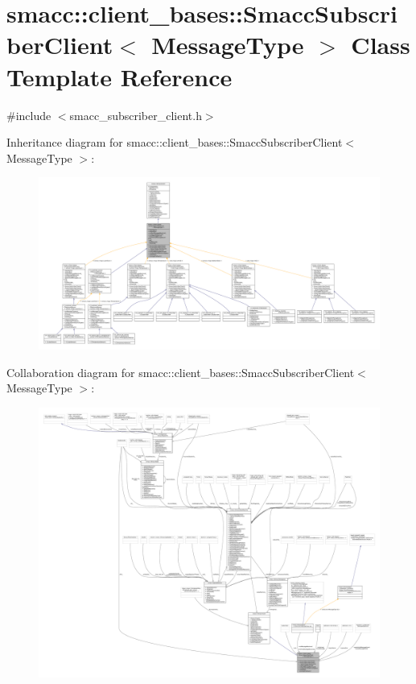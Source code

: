 \hypertarget{classsmacc_1_1client__bases_1_1SmaccSubscriberClient}{}\section{smacc\+:\+:client\+\_\+bases\+:\+:Smacc\+Subscriber\+Client$<$ Message\+Type $>$ Class Template Reference}
\label{classsmacc_1_1client__bases_1_1SmaccSubscriberClient}


{\ttfamily \#include $<$smacc\+\_\+subscriber\+\_\+client.\+h$>$}



Inheritance diagram for smacc\+:\+:client\+\_\+bases\+:\+:Smacc\+Subscriber\+Client$<$ Message\+Type $>$\+:
\nopagebreak
\begin{figure}[H]
\begin{center}
\leavevmode
\includegraphics[width=350pt]{classsmacc_1_1client__bases_1_1SmaccSubscriberClient__inherit__graph}
\end{center}
\end{figure}


Collaboration diagram for smacc\+:\+:client\+\_\+bases\+:\+:Smacc\+Subscriber\+Client$<$ Message\+Type $>$\+:
\nopagebreak
\begin{figure}[H]
\begin{center}
\leavevmode
\includegraphics[width=350pt]{classsmacc_1_1client__bases_1_1SmaccSubscriberClient__coll__graph}
\end{center}
\end{figure}
